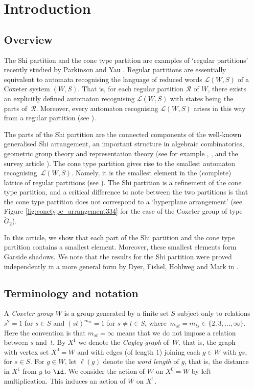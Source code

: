 \section{Introduction}

\subsection*{Overview}
The Shi partition and the cone type partition are examples of `regular partitions' recently studied by Parkinson and Yau \cite{Parkinson-Yau_2022}. Regular partitions are essentially equivalent to automata recognising the language of reduced words $\mathcal{L}(W,S)$ of a Coxeter system $(W,S)$. That is, for each regular partition $\mathscr{R}$ of $W$, there exists an explicitly defined automaton recognising $\mathcal{L}(W,S)$ with states being the parts of~$\mathscr{R}$. Moreover, every automaton recognising $\mathcal{L}(W,S)$ arises in this way from a regular partition (see \cite[Thm.~2]{Parkinson-Yau_2022}).

The parts of the Shi partition are the connected components of the well-known generalised Shi arrangement, an important structure in algebraic combinatorics, geometric group theory and representation theory (see for example \cite{DH}, \cite{DHFM}, and the survey article \cite{MR3969572}). The cone type partition gives rise to the smallest automaton recognising~$\mathcal{L}(W,S)$. Namely, it is the smallest element in the (complete) lattice of regular partitions (see \cite[Thm.~3 and Cor.~4]{Parkinson-Yau_2022}). The Shi partition is a refinement of the cone type partition, and a critical difference to note between the two partitions is that the cone type partition does not correspond to a `hyperplane arrangement' (see Figure \ref{fig:conetype_arrangement334} for the case of the Coxeter group of type $\widetilde{G}_2$).

In this article, we show that each part of the Shi partition and the cone type partition contains a smallest element. Moreover, these smallest elements form Garside shadows. We note that the results for the Shi partition were proved independently in a more general form by Dyer, Fishel, Hohlweg and Mark in \cite[Thm.~1.1(1)]{DHFM}.

\subsection*{Terminology and notation} 

A \emph{Coxeter group} $W$ is a group generated by a finite set $S$ subject only to relations $s^2=1$
for $s\in S$ and $(st)^{m_{st}}=1$ for $s\neq t\in S$, where~$m_{st}=m_{ts}\in \{2,3,\ldots,\infty\}$. Here the convention is that $m_{st}=\infty$
means that we do not impose a relation between $s$ and~$t$. By $X^1$ we denote the \emph{Cayley graph} of~$W$, that is, the graph with vertex set $X^0=W$
and with edges (of length $1$) joining each $g\in W$ with $gs$, for $s\in S$. For $g\in W$, let $\ell(g)$ denote the \emph{word length} of $g$, that is, the distance in $X^1$ from $g$ to $\id$.
We
consider the action of $W$ on $X^0=W$ by left multiplication. This induces an action of $W$ on $X^1$.

